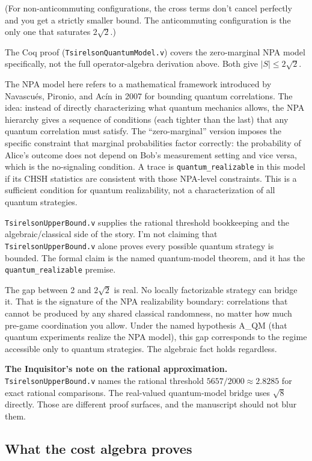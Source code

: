 \documentclass[11pt,a4paper]{article}
\theoremstyle{plain}
\theoremstyle{definition}
\theoremstyle{remark}
\begin{document}
(For non-anticommuting configurations, the cross terms don't cancel perfectly and you get a strictly smaller bound. The anticommuting configuration is the only one that saturates $2\sqrt{2}$.)

The Coq proof (\texttt{TsirelsonQuantumModel.v}) covers the zero-marginal NPA model specifically, not the full operator-algebra derivation above. Both give $|S| \leq 2\sqrt{2}$.

The NPA model here refers to a mathematical framework introduced by Navascués, Pironio, and Acín in 2007 for bounding quantum correlations. The idea: instead of directly characterizing what quantum mechanics allows, the NPA hierarchy gives a sequence of conditions (each tighter than the last) that any quantum correlation must satisfy. The ``zero-marginal'' version imposes the specific constraint that marginal probabilities factor correctly: the probability of Alice's outcome does not depend on Bob's measurement setting and vice versa, which is the no-signaling condition. A trace is \texttt{quantum\_realizable} in this model if its CHSH statistics are consistent with those NPA-level constraints. This is a sufficient condition for quantum realizability, not a characterization of all quantum strategies.

\texttt{TsirelsonUpperBound.v} supplies the rational threshold bookkeeping and the algebraic/classical side of the story. I'm not claiming that \texttt{TsirelsonUpperBound.v} alone proves every possible quantum strategy is bounded. The formal claim is the named quantum-model theorem, and it has the \texttt{quantum\_realizable} premise.

The gap between 2 and $2\sqrt{2}$ is real. No locally factorizable strategy can bridge it. That is the signature of the NPA realizability boundary: correlations that cannot be produced by any shared classical randomness, no matter how much pre-game coordination you allow. Under the named hypothesis A\_QM (that quantum experiments realize the NPA model), this gap corresponds to the regime accessible only to quantum strategies. The algebraic fact holds regardless.

\medskip
\textbf{The Inquisitor's note on the rational approximation.} \texttt{TsirelsonUpperBound.v} names the rational threshold $5657/2000 \approx 2.8285$ for exact rational comparisons. The real-valued quantum-model bridge uses $\sqrt{8}$ directly. Those are different proof surfaces, and the manuscript should not blur them.

\subsection{What the cost algebra proves}
\end{document}
